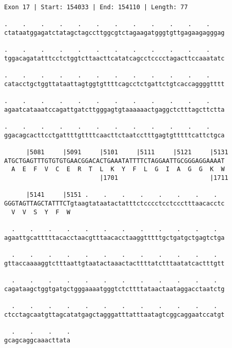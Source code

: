 \documentclass{article}
\begin{document}
\newpage
\begin{Verbatim}
Exon 17 | Start: 154033 | End: 154110 | Length: 77
 
.    .    .    .    .    .    .    .    .    .    .    .    
ctataatggagatctatagctagccttggcgtctagaagatgggtgttgagaagagggag
  
.    .    .    .    .    .    .    .    .    .    .    .    
tggacagatatttcctctggtcttaacttcatatcagcctcccctagacttccaaatatc
  
.    .    .    .    .    .    .    .    .    .    .    .    
catacctgctggttataattagtggtgttttcagcctctgattctgtcaccaggggtttt
  
.    .    .    .    .    .    .    .    .    .    .    .    
agaatcataaatccagattgatcttgggagtgtaaaaaactgaggctctttagcttctta
  
.    .    .    .    .    .    .    .    .    .    .    .    
ggacagcacttcctgattttgttttcaacttctaatcctttgagtgtttttcattctgca
  
      |5081     |5091     |5101     |5111     |5121     |5131
ATGCTGAGTTTGTGTGTGAACGGACACTGAAATATTTTCTAGGAATTGCGGGAGGAAAAT
  A  E  F  V  C  E  R  T  L  K  Y  F  L  G  I  A  G  G  K  W
                          |1701                         |1711
  
      |5141     |5151 .    .    .    .    .    .    .    .  
GGGTAGTTAGCTATTTCTgtaagtataatactatttctcccctcctccctttaacacctc
  V  V  S  Y  F  W                                          
  
  .    .    .    .    .    .    .    .    .    .    .    .  
agaattgcatttttacacctaacgtttaacacctaaggtttttgctgatgctgagtctga
  
  .    .    .    .    .    .    .    .    .    .    .    .  
gttaccaaaaggtctttaattgtaatactaaactacttttatctttaatatcactttgtt
  
  .    .    .    .    .    .    .    .    .    .    .    .  
cagataagctggtgatgctgggaaaatgggtctcttttataactaataggacctaatctg
  
  .    .    .    .    .    .    .    .    .    .    .    .  
ctcctagcaatgttagcatatgagctagggatttatttaatagtcggcaggaatccatgt
  
  .    .    .    .
gcagcaggcaaacttata
\end{Verbatim}
\newpage
\end{document}
